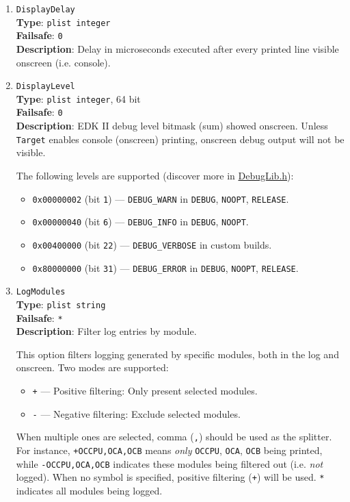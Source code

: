 \documentclass[]{article}
\providecommand{\tightlist}{%
  \setlength{\itemsep}{0pt}\setlength{\parskip}{0pt}}
\begin{document}
\begin{enumerate}
\item
  \texttt{DisplayDelay}\\
  \textbf{Type}: \texttt{plist\ integer}\\
  \textbf{Failsafe}: \texttt{0}\\
  \textbf{Description}: Delay in microseconds executed after
  every printed line visible onscreen (i.e. console).

\item
  \texttt{DisplayLevel}\\
  \textbf{Type}: \texttt{plist\ integer}, 64 bit\\
  \textbf{Failsafe}: \texttt{0}\\
  \textbf{Description}: EDK II debug level bitmask (sum) showed onscreen.
  Unless \texttt{Target} enables console (onscreen) printing,
  onscreen debug output will not be visible.

  The following levels are supported (discover more in
  \href{https://github.com/acidanthera/audk/blob/master/MdePkg/Include/Library/DebugLib.h}{DebugLib.h}):

  \begin{itemize}
  \tightlist
    \item \texttt{0x00000002} (bit \texttt{1}) --- \texttt{DEBUG\_WARN} in \texttt{DEBUG},
      \texttt{NOOPT}, \texttt{RELEASE}.
    \item \texttt{0x00000040} (bit \texttt{6}) --- \texttt{DEBUG\_INFO} in \texttt{DEBUG},
      \texttt{NOOPT}.
    \item \texttt{0x00400000} (bit \texttt{22}) --- \texttt{DEBUG\_VERBOSE} in custom builds.
    \item \texttt{0x80000000} (bit \texttt{31}) --- \texttt{DEBUG\_ERROR} in \texttt{DEBUG},
      \texttt{NOOPT}, \texttt{RELEASE}.
  \end{itemize}

\item
  \texttt{LogModules}\\
  \textbf{Type}: \texttt{plist\ string}\\
  \textbf{Failsafe}: \texttt{*}\\
  \textbf{Description}: Filter log entries by module.

  This option filters logging generated by specific modules, both in the log and onscreen.
  Two modes are supported:
  \begin{itemize}
    \tightlist
    \item \texttt{+} --- Positive filtering: Only present selected modules.
    \item \texttt{-} --- Negative filtering: Exclude selected modules.
  \end{itemize}
  When multiple ones are selected, comma (\texttt{,}) should be used as the splitter.
  For instance, \texttt{+OCCPU,OCA,OCB} means \emph{only} \texttt{OCCPU}, \texttt{OCA}, \texttt{OCB} being printed,
  while \texttt{-OCCPU,OCA,OCB} indicates these modules being filtered out (i.e. \emph{not} logged).
  When no symbol is specified, positive filtering (\texttt{+}) will be used.
  \texttt{*} indicates all modules being logged.


\end{enumerate}
\end{document}
